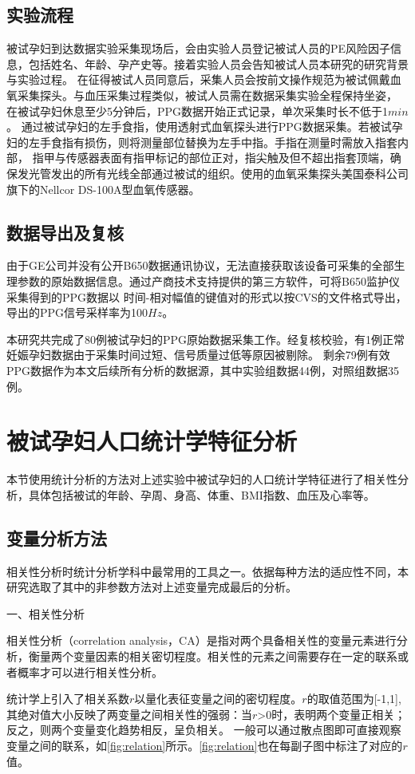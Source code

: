 \subsection{实验流程}
被试孕妇到达数据实验采集现场后，会由实验人员登记被试人员的PE风险因子信息，包括姓名、年龄、孕产史等。接着实验人员会告知被试人员本研究的研究背景与实验过程。
在征得被试人员同意后，采集人员会按前文操作规范为被试佩戴血氧采集探头\cite{Chen2021}。与血压采集过程类似\cite{FIGO}，被试人员需在数据采集实验全程保持坐姿，
在被试孕妇休息至少5分钟后，PPG数据开始正式记录，单次采集时长不低于1$min$。
通过被试孕妇的左手食指，使用透射式血氧探头进行PPG数据采集。若被试孕妇的左手食指有损伤，则将测量部位替换为左手中指。手指在测量时需放入指套内部，
指甲与传感器表面有指甲标记的部位正对，指尖触及但不超出指套顶端，确保发光管发出的所有光线全部通过被试的组织。使用的血氧采集探头美国泰科公司旗下的Nellcor DS-100A型血氧传感器。 

\subsection{数据导出及复核}
由于GE公司并没有公开B650数据通讯协议，无法直接获取该设备可采集的全部生理参数的原始数据信息。通过产商技术支持提供的第三方软件，可将B650监护仪采集得到的PPG数据以
时间-相对幅值的键值对的形式以按CVS的文件格式导出，导出的PPG信号采样率为100$Hz$。

本研究共完成了80例被试孕妇的PPG原始数据采集工作。经复核校验，有1例正常妊娠孕妇数据由于采集时间过短、信号质量过低等原因被剔除。
剩余79例有效PPG数据作为本文后续所有分析的数据源，其中实验组数据44例，对照组数据35例。
\section{被试孕妇人口统计学特征分析}
本节使用统计分析的方法对上述实验中被试孕妇的人口统计学特征进行了相关性分析，具体包括被试的年龄、孕周、身高、体重、BMI指数、血压及心率等。
\subsection{变量分析方法}
相关性分析时统计分析学科中最常用的工具之一。依据每种方法的适应性不同，本研究选取了其中的非参数方法对上述变量完成最后的分析。

一、相关性分析

相关性分析（correlation analysis，CA）是指对两个具备相关性的变量元素进行分析，衡量两个变量因素的相关密切程度\cite{Zhang2019}。相关性的元素之间需要存在一定的联系或者概率才可以进行相关性分析。

统计学上引入了相关系数$r$以量化表征变量之间的密切程度。$r$的取值范围为[-1,1],其绝对值大小反映了两变量之间相关性的强弱：当$r$>0时，表明两个变量正相关；反之，则两个变量变化趋势相反，呈负相关。
一般可以通过散点图即可直接观察变量之间的联系，如\autoref{fig:relation}所示。\autoref{fig:relation}也在每副子图中标注了对应的$r$值。

